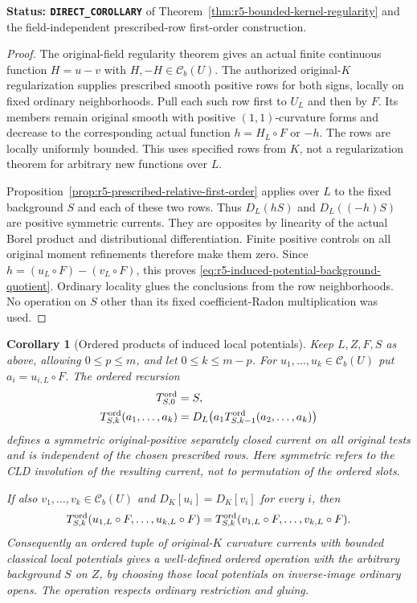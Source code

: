 \documentclass[11pt,a4paper]{article}
\numberwithin{equation}{section}
\newtheorem{corollary}[theorem]{Corollary}
\theoremstyle{definition}
\theoremstyle{remark}
\begin{document}
\noindent\textbf{Status: \texttt{DIRECT\_COROLLARY}} of
Theorem~\ref{thm:r5-bounded-kernel-regularity} and the
field-independent prescribed-row first-order construction.

\begin{proof}
The original-field regularity theorem gives an actual finite
continuous function $H=u-v$ with $H,-H\in\mathcal C_b(U)$.
The authorized original-$K$ regularization supplies prescribed
smooth positive rows for both signs, locally on fixed ordinary
neighborhoods.  Pull each such row first to $U_L$ and then by
$F$.  Its members remain original smooth with positive
$(1,1)$-curvature forms and decrease to the corresponding
actual function $h=H_L\circ F$ or $-h$.  The rows are locally
uniformly bounded.  This uses specified rows from $K$, not a
regularization theorem for arbitrary new functions over $L$.

Proposition~\ref{prop:r5-prescribed-relative-first-order}
applies over $L$ to the fixed background $S$ and each of these
two rows.  Thus $D_L(hS)$ and $D_L((-h)S)$ are positive
symmetric currents.  They are opposites by linearity of the
actual Borel product and distributional differentiation.
Finite positive controls on all original moment refinements
therefore make them zero.  Since
$h=(u_L\circ F)-(v_L\circ F)$, this proves
\eqref{eq:r5-induced-potential-background-quotient}.
Ordinary locality glues the conclusions from the row
neighborhoods.  No operation on $S$ other than its fixed
coefficient-Radon multiplication was used.
\end{proof}

\begin{corollary}[Ordered products of induced local potentials]
\label{cor:r5-induced-ordered-slot-descent}
Keep $L,Z,F,S$ as above, allowing $0\leq p\leq m$, and let
$0\leq k\leq m-p$.  For
$u_1,\ldots,u_k\in\mathcal C_b(U)$ put
$a_i=u_{i,L}\circ F$.  The ordered recursion
\[
 \begin{split}
 T^{\rm ord}_{S,0}&=S,\\
 T^{\rm ord}_{S,k}(a_1,\ldots,a_k)
   &=D_L\bigl(a_1T^{\rm ord}_{S,k-1}(a_2,\ldots,a_k)\bigr)
 \end{split}
\]
defines a symmetric original-positive separately closed current
on all original tests and is independent of the chosen
prescribed rows.  Here \emph{symmetric} refers to the CLD
involution of the resulting current, not to permutation of
the ordered slots.

If also $v_1,\ldots,v_k\in\mathcal C_b(U)$ and
$D_K[u_i]=D_K[v_i]$ for every $i$, then
\begin{equation}
 T^{\rm ord}_{S,k}(u_{1,L}\circ F,\ldots,u_{k,L}\circ F)
   =T^{\rm ord}_{S,k}(v_{1,L}\circ F,\ldots,v_{k,L}\circ F).
 \label{eq:r5-induced-ordered-slot-descent}
\end{equation}
Consequently an ordered tuple of original-$K$ curvature currents
with bounded classical local potentials gives a well-defined
ordered operation with the arbitrary background $S$ on $Z$,
by choosing those local potentials on inverse-image ordinary
opens.  The operation respects ordinary restriction and gluing.
\end{corollary}
\end{document}
